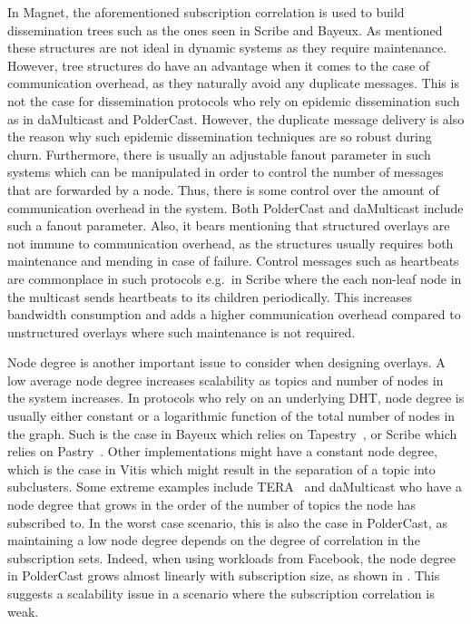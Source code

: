 In Magnet, the aforementioned subscription correlation is used to build
dissemination trees such as the ones seen in Scribe and Bayeux. As
mentioned these structures are not ideal in dynamic systems as they
require maintenance. However, tree structures do have an advantage when
it comes to the case of communication overhead, as they naturally avoid
any duplicate messages. This is not the case for dissemination protocols
who rely on epidemic dissemination such as in daMulticast and
PolderCast.  However, the duplicate message delivery is also the reason
why such epidemic dissemination techniques are so robust during churn.
Furthermore, there is usually an adjustable fanout parameter in such
systems which can be manipulated in order to control the number of
messages that are forwarded by a node. Thus, there is some control over
the amount of communication overhead in the system. Both PolderCast and
daMulticast include such a fanout parameter. Also, it bears mentioning
that structured overlays are not immune to communication overhead, as
the structures usually requires both maintenance and mending in case of
failure. Control messages such as heartbeats are commonplace in such
protocols e.g.\ in Scribe where the each non-leaf node in the multicast
sends heartbeats to its children periodically.  This increases bandwidth
consumption and adds a higher communication overhead compared to
unstructured overlays where such maintenance is not required.

Node degree is another important issue to consider when designing
overlays. A low average node degree increases scalability as topics and
number of nodes in the system increases. In protocols who rely on an
underlying DHT, node degree is usually either constant or a logarithmic function of the
total number of nodes in the graph. Such is the case in Bayeux which
relies on Tapestry~\cite{tapestry}, or Scribe which relies on
Pastry~\cite{Rowstron:2001}. Other implementations might have a constant
node degree, which is the case in Vitis which might result in the
separation of a topic into subclusters. Some extreme examples include
TERA~\cite{Baldoni:2007} and daMulticast who have a node degree that
grows in the order of the number of topics the node has subscribed to.
In the worst
case scenario, this is also the case in PolderCast, as maintaining a low node
degree depends on the degree of correlation in the subscription sets.
Indeed, when using workloads from Facebook, the node degree in
PolderCast grows almost linearly with subscription size, as shown in
\cite{Setty:2012}. This suggests a scalability issue in a scenario where the
subscription correlation is weak.


